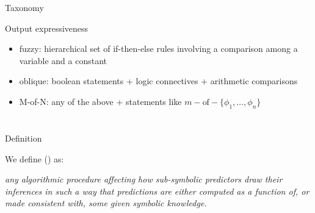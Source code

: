 \documentclass[presentation]{beamer}\mode<presentation>{\usetheme{AMSBolognaFC}}
\begin{document}
\begin{frame}[allowframebreaks]{Taxonomy}
\begin{block}{Output expressiveness}
\begin{itemize}
            \item fuzzy: hierarchical set of if-then-else rules involving a comparison among a variable and a constant   
            \item oblique: boolean statements + logic connectives + arithmetic comparisons
            \item M-of-N: any of the above + statements like $m-\text{of}-\{\phi_1, \ldots, \phi_n \}$
        \end{itemize} 
        
    \end{block}
\end{frame}


\section{\longski}
    
\begin{frame}[c]{Definition}
    \begin{block}{We define \longski{}(\ski) as: }
        \begin{displayquote}\itshape
            any \emph{algorithmic} procedure affecting how \alert{sub-symbolic predictors} draw their inferences in such a way that predictions are either \emph{computed} as a function of, or made \emph{consistent} with, some \emph{given} \alert{symbolic knowledge}.
        \end{displayquote}
    \end{block}
    
\end{frame}
\end{document}
